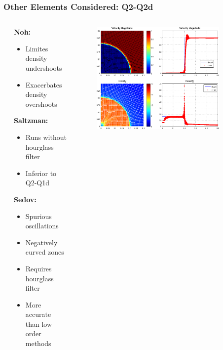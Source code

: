 \documentclass[8pt,xcolor=svgnames]{beamer}
\begin{document}
\begin{frame}
 \frametitle{Other Elements Considered: Q2-Q2d}
 \begin{columns}[T]
\begin{column}{0.02\textwidth}
\end{column}
  \begin{column}{0.24\textwidth}
  \bigskip
\textbf{Noh:}
   \begin{itemize}
    \item Limites density undershoots
    \item Exacerbates density overshoots
   \end{itemize}
\textbf{Saltzman:}
   \begin{itemize}
    \item Runs without hourglass filter
    \item Inferior to Q2-Q1d
   \end{itemize}
\textbf{Sedov:}
   \begin{itemize}
    \item Spurious oscillations
    \item Negatively curved zones
    \item Requires hourglass filter
    \item More accurate than low order methods
   \end{itemize}
  \end{column}
  \begin{column}{0.8\textwidth}
   \begin{figure}[h!]
    \centering
    \includegraphics[width=0.9\textwidth,keepaspectratio=true]{./Images/Noh_Q2Q2_30x30.png}
    \end{figure}
  \end{column}
 \end{columns}
\end{frame}
\end{document}
